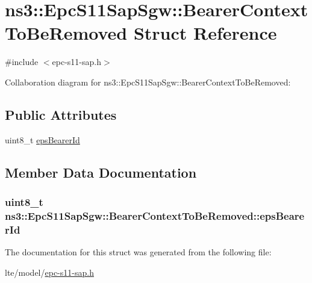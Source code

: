 \hypertarget{structns3_1_1EpcS11SapSgw_1_1BearerContextToBeRemoved}{}\section{ns3\+:\+:Epc\+S11\+Sap\+Sgw\+:\+:Bearer\+Context\+To\+Be\+Removed Struct Reference}
\label{structns3_1_1EpcS11SapSgw_1_1BearerContextToBeRemoved}


{\ttfamily \#include $<$epc-\/s11-\/sap.\+h$>$}



Collaboration diagram for ns3\+:\+:Epc\+S11\+Sap\+Sgw\+:\+:Bearer\+Context\+To\+Be\+Removed\+:
\subsection*{Public Attributes}
\begin{DoxyCompactItemize}
\item 
uint8\+\_\+t \hyperlink{structns3_1_1EpcS11SapSgw_1_1BearerContextToBeRemoved_a9d1777b6fdbd6b25e3df9c2b54432c20}{eps\+Bearer\+Id}
\end{DoxyCompactItemize}


\subsection{Member Data Documentation}
\subsubsection[{\texorpdfstring{eps\+Bearer\+Id}{epsBearerId}}]{\setlength{\rightskip}{0pt plus 5cm}uint8\+\_\+t ns3\+::\+Epc\+S11\+Sap\+Sgw\+::\+Bearer\+Context\+To\+Be\+Removed\+::eps\+Bearer\+Id}\hypertarget{structns3_1_1EpcS11SapSgw_1_1BearerContextToBeRemoved_a9d1777b6fdbd6b25e3df9c2b54432c20}{}\label{structns3_1_1EpcS11SapSgw_1_1BearerContextToBeRemoved_a9d1777b6fdbd6b25e3df9c2b54432c20}


The documentation for this struct was generated from the following file\+:\begin{DoxyCompactItemize}
\item 
lte/model/\hyperlink{epc-s11-sap_8h}{epc-\/s11-\/sap.\+h}\end{DoxyCompactItemize}

